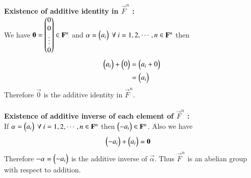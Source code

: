 {\bf Existence of additive identity in $\vec{F}^n$ :} \\ 
We have $\mathbf{0}=\begin{pmatrix}0\\ 0\\ \vdots\\ 0\end{pmatrix} \in \mathbf{F}^n$
and $\alpha=\begin{pmatrix}a_i\end{pmatrix} \ \forall \ i=1,2,\cdots,n  \in \mathbf{F}^n$ then
\begin{align}
	\begin{pmatrix}a_i\end{pmatrix}+\begin{pmatrix}0\end{pmatrix}
	&=\begin{pmatrix}a_i+0\end{pmatrix} \\
	&=\begin{pmatrix}a_i\end{pmatrix} 
\end{align}
Therefore $\vec{0}$ is the additive identity in 
$\vec{F}^n$.\\ \\
{\bf Existence of additive inverse of each element of $\vec{F}^n$ :} \\
If $\alpha=\begin{pmatrix}a_i\end{pmatrix} \ \forall \ i =1,2,\cdots,n \in \mathbf{F}^n$ then 
$\begin{pmatrix}-a_i\end{pmatrix} \in \mathbf{F}^n$. 
Also we have
\begin{align}
	\begin{pmatrix}-a_i\end{pmatrix}
	+\begin{pmatrix}a_i\end{pmatrix}
	&=\mathbf{0}
\end{align}
Therefore $\mathbf{-\alpha}=\begin{pmatrix}-a_i\end{pmatrix}$ is the 
additive inverse of $\vec{\alpha}$.
Thus $\vec{F}^n$ is an abelian group with respect to addition. \\

